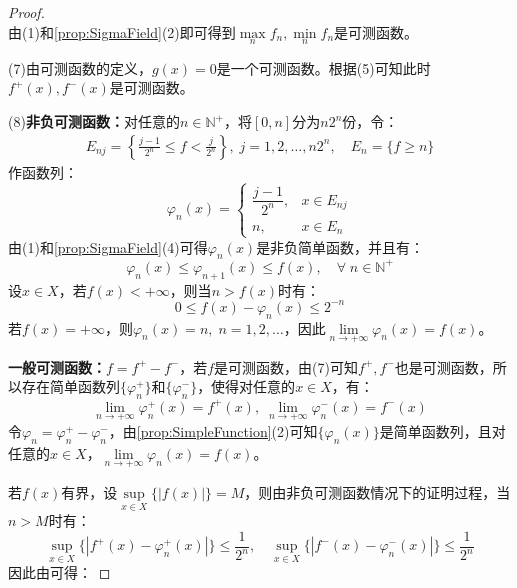 \begin{proof}
\begin{equation*}
	\end{equation*}
	由(1)和\cref{prop:SigmaField}(2)即可得到$\max\limits_nf_n,\min\limits_nf_n$是可测函数。\par
	(7)由可测函数的定义，$g(x)=0$是一个可测函数。根据(5)可知此时$f^+(x),f^-(x)$是可测函数。\par
	(8)\textbf{非负可测函数：}对任意的$n\in\mathbb{N}^+$，将$[0,n]$分为$n2^n$份，令：
	\begin{gather*}
		E_{nj}=\left\{\frac{j-1}{2^n}\leqslant f<\frac{j}{2^n}\right\},\;j=1,2,\dots,n2^n ,\quad E_n=\{f\geqslant n\}
	\end{gather*}
	作函数列：
	\begin{equation*}
		\varphi_n(x)=
		\begin{cases}
			\dfrac{j-1}{2^n},&x\in E_{nj} \\
			n,&x\in E_n
		\end{cases}
	\end{equation*}
	由(1)和\cref{prop:SigmaField}(4)可得$\varphi_n(x)$是非负简单函数，并且有：
	\begin{equation*}
		\varphi_n(x)\leqslant\varphi_{n+1}(x)\leqslant f(x),\quad\forall\;n\in\mathbb{N}^+
	\end{equation*}
	设$x\in X$，若$f(x)<+\infty$，则当$n>f(x)$时有：
	\begin{equation*}
		0\leqslant f(x)-\varphi_n(x)\leqslant 2^{-n}
	\end{equation*}
	若$f(x)=+\infty$，则$\varphi_n(x)=n,\;n=1,2,\dots$，因此$\lim\limits_{n\to+\infty}\varphi_n(x)=f(x)$。\par
	\textbf{一般可测函数：}$f=f^+-f^-$，若$f$是可测函数，由(7)可知$f^+,f^-$也是可测函数，所以存在简单函数列$\{\varphi_n^+\}$和$\{\varphi_n^-\}$，使得对任意的$x\in X$，有：
	\begin{equation*}
		\lim\limits_{n\to+\infty}\varphi_n^+(x)=f^+(x),\;
		\lim\limits_{n\to+\infty}\varphi_n^-(x)=f^-(x)
	\end{equation*}
	令$\varphi_n=\varphi_n^+-\varphi_n^-$，由\cref{prop:SimpleFunction}(2)可知$\{\varphi_n(x)\}$是简单函数列，且对任意的$x\in X$，$\lim\limits_{n\to+\infty}\varphi_n(x)=f(x)$。\par
	若$f(x)$有界，设$\sup\limits_{x\in X}\{|f(x)|\}=M$，则由非负可测函数情况下的证明过程，当$n>M$时有：
	\begin{equation*}
		\sup_{x\in X}\{|f^+(x)-\varphi_n^+(x)|\}\leqslant\frac{1}{2^n},\quad
		\sup_{x\in X}\{|f^-(x)-\varphi_n^-(x)|\}\leqslant\frac{1}{2^n}
	\end{equation*}
	因此由可得：

\end{proof}
